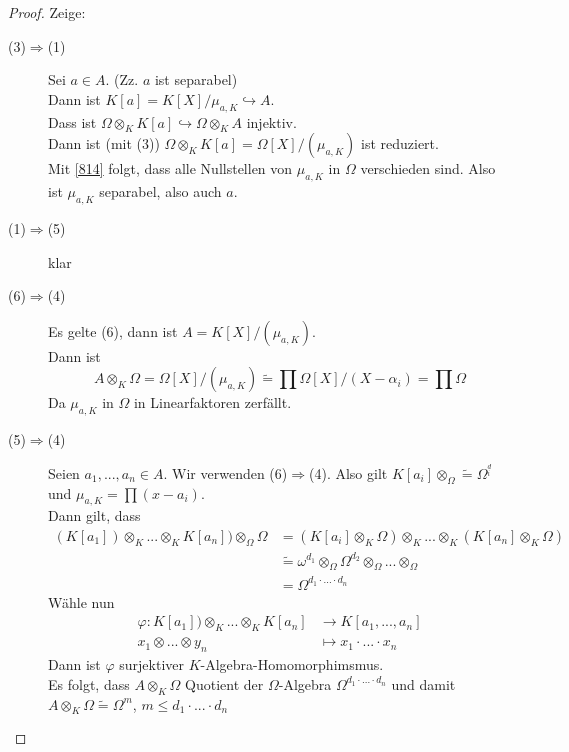 \documentclass[10pt,a4paper]{article}
\newcommand{\al}{\ensuremath{\alpha}}
\newcommand{\isomorph}{\ensuremath{\tilde{=}}}
\theoremstyle{definition}
\theoremstyle{plain}
\theoremstyle{remark}
\begin{document}
\begin{proof}
	Zeige:\\
	\begin{center}
	\end{center}

	\begin{description}
		\item[(3)$\Rightarrow$(1)] Sei $a\in A$. (Zz. $a$ ist separabel)\\
		Dann ist $K[a]=K[X]/\mu_{a,K}\hookrightarrow A$.\\
		Dass ist $\Omega\otimes_K K[a]\hookrightarrow \Omega\otimes_K A$ injektiv.\\
		Dann ist (mit (3)) $\Omega\otimes_K K[a]=\Omega[X]/(\mu_{a,K})$ ist reduziert.\\
		Mit \ref{814} folgt, dass alle Nullstellen von $\mu_{a,K}$ in $\Omega$ verschieden sind. Also ist $\mu_{a,K}$ separabel, also auch $a$.
		\item[(1)$\Rightarrow$(5)] klar
		\item[(6)$\Rightarrow$(4)] Es gelte (6), dann ist $A=K[X]/(\mu_{a,K})$.\\
		Dann ist 
		\[A\otimes_K\Omega=\Omega[X]/(\mu_{a,K})\isomorph\prod \Omega[X]/(X-\al_i)=\prod\Omega\]
		Da $\mu_{a,K}$ in $\Omega$ in Linearfaktoren zerfällt.
		\item[(5)$\Rightarrow$(4)] Seien $a_1,...,a_n\in A$. Wir verwenden (6)$\Rightarrow$(4). Also gilt $K[a_i]\otimes_\Omega\isomorph \Omega^{^d_i}$ und $\mu_{a,K}=\prod (x-a_i)$.\\
		Dann gilt, dass
		\begin{align*}
		(K[a_1])\otimes_K...\otimes_K K[a_n])\otimes_\Omega \Omega &=(K[a_i]\otimes_K\Omega)\otimes_K...\otimes_K(K[a_n]\otimes_K\Omega)\\
		&\isomorph\omega^{d_1}\otimes_\Omega \Omega^{d_2}\otimes_\Omega...\otimes_\Omega\\
		&=\Omega^{d_1\cdot...\cdot d_n}
		\end{align*}
		Wähle nun
		\begin{align*}
		\varphi:K[a_1])\otimes_K...\otimes_K K[a_n]&\to K[a_1,...,a_n]\\
		x_1\otimes...\otimes y_n&\mapsto x_1\cdot...\cdot x_n
		\end{align*}
		Dann ist $\varphi$ surjektiver $K$-Algebra-Homomorphimsmus.\\
		Es folgt, dass $A\otimes_K\Omega$ Quotient der $\Omega$-Algebra $\Omega^{d_1\cdot...\cdot d_n}$ und damit $A\otimes_K\Omega\isomorph \Omega^m$, $m\leq d_1\cdot...\cdot d_n$
	\end{description}
\end{proof}
\end{document}
